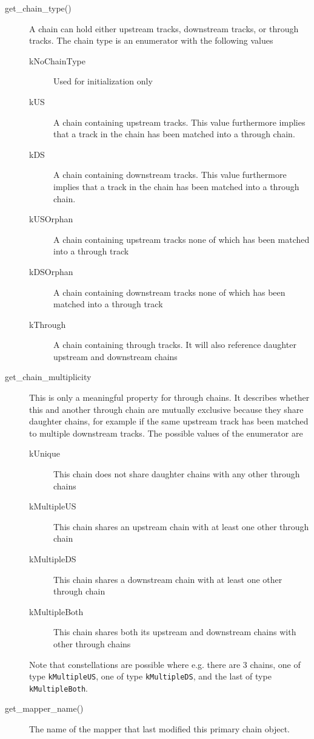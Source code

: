 \begin{description}
  \item [get\_chain\_type()] A chain can hold either upstream tracks, downstream tracks, or through tracks. The chain type is an enumerator with the following values
  \begin{description}
    \item [kNoChainType] Used for initialization only
    \item [kUS] A chain containing upstream tracks. This value furthermore implies that a track in the chain has been matched into a through chain.
    \item [kDS] A chain containing downstream tracks. This value furthermore implies that a track in the chain has been matched into a through chain.
    \item [kUSOrphan] A chain containing upstream tracks none of which has been matched into a through track
    \item [kDSOrphan] A chain containing downstream tracks none of which has been matched into a through track
    \item [kThrough] A chain containing through tracks. It will also reference daughter upstream and downstream chains
  \end{description}
  \item [get\_chain\_multiplicity] This is only a meaningful property for through chains. It describes whether this and another through chain are mutually exclusive
        because they share daughter chains, for example if the same upstream track has been matched to multiple downstream tracks. The possible values of the enumerator are
  \begin{description}
    \item [kUnique] This chain does not share daughter chains with any other through chains
    \item [kMultipleUS] This chain shares an upstream chain with at least one other through chain
    \item [kMultipleDS] This chain shares a downstream chain with at least one other through chain
    \item [kMultipleBoth] This chain shares both its upstream and downstream chains with other through chains
  \end{description}
  Note that constellations are possible where e.g. there are 3 chains, one of type \texttt{kMultipleUS}, one of type \texttt{kMultipleDS},
  and the last of type \texttt{kMultipleBoth}.
  \item [get\_mapper\_name()] The name of the mapper that last modified this primary chain object.

\end{description}
